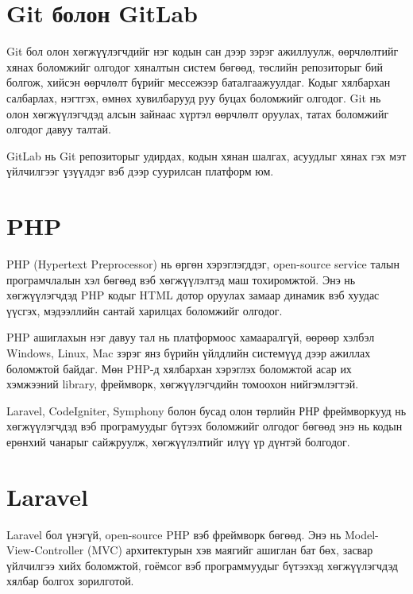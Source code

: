 \section{Git болон GitLab}
Git бол олон хөгжүүлэгчдийг нэг кодын сан дээр зэрэг ажиллуулж, өөрчлөлтийг хянах боломжийг олгодог хяналтын систем бөгөөд, төслийн репозиторыг бий болгож, хийсэн өөрчлөлт бүрийг мессежээр баталгаажуулдаг. Кодыг хялбархан салбарлах, нэгтгэх, өмнөх хувилбарууд руу буцах боломжийг олгодог. Git нь олон хөгжүүлэгчдэд алсын зайнаас хүртэл өөрчлөлт оруулах, татах боломжийг олгодог давуу талтай.

GitLab нь Git репозиторыг удирдах, кодын хянан шалгах, асуудлыг хянах гэх мэт үйлчилгээг үзүүлдэг вэб дээр суурилсан платформ юм.

\section{PHP}
PHP (Hypertext Preprocessor) нь өргөн хэрэглэгддэг, open-source service талын програмчлалын хэл бөгөөд вэб хөгжүүлэлтэд маш тохиромжтой. Энэ нь хөгжүүлэгчдэд PHP кодыг HTML дотор оруулах замаар динамик вэб хуудас үүсгэх, мэдээллийн сантай харилцах боломжийг олгодог.

PHP ашиглахын нэг давуу тал нь платформоос хамааралгүй, өөрөөр хэлбэл Windows, Linux, Mac зэрэг янз бүрийн үйлдлийн системүүд дээр ажиллах боломжтой байдаг. Мөн PHP-д хялбархан хэрэглэх боломжтой асар их хэмжээний library, фреймворк, хөгжүүлэгчдийн томоохон нийгэмлэгтэй.

Laravel, CodeIgniter, Symphony болон бусад олон төрлийн РНР фреймворкууд нь хөгжүүлэгчдэд вэб програмуудыг бүтээх боломжийг олгодог бөгөөд энэ нь кодын ерөнхий чанарыг сайжруулж, хөгжүүлэлтийг илүү үр дүнтэй болгодог. 

\section{Laravel}
Laravel бол үнэгүй, open-source PHP вэб фреймворк бөгөөд. 
Энэ нь Model-View-Controller (MVC) архитектурын хэв маягийг ашиглан бат бөх, засвар үйлчилгээ хийх боломжтой, гоёмсог вэб программуудыг бүтээхэд хөгжүүлэгчдэд хялбар болгох зорилготой.

